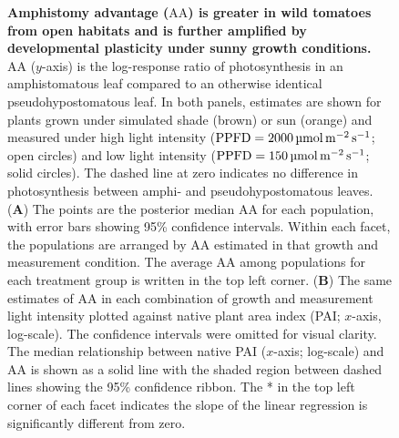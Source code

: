 \documentclass[
  letterpaper,
  DIV=11,
  numbers=noendperiod]{scrartcl}
\newcommand{\aax}{$\mathrm{AA}$}
\newcommand{\ppfdequals}[1]{$\mathrm{PPFD} = \qty{#1}{\micro\mol\raiseto{-2}\meter\raiseto{-1}\second}$}
\begin{document}
\begin{linenumbers}
\begin{doublespace}
\begin{figure}
\caption{\label{fig-aacap}\textbf{Amphistomy advantage (\aax{}) is greater in wild tomatoes from open habitats and is further amplified by developmental plasticity under sunny growth conditions.}
\aax{} (\(y\)-axis) is the log-response ratio of photosynthesis in an
amphistomatous leaf compared to an otherwise identical
pseudohypostomatous leaf. In both panels, estimates are shown for plants
grown under simulated shade (brown) or sun (orange) and measured under
high light intensity (\ppfdequals{2000}; open circles) and low light
intensity (\ppfdequals{150}; solid circles). The dashed line at zero
indicates no difference in photosynthesis between amphi- and
pseudohypostomatous leaves. (\textbf{A}) The points are the posterior
median \aax{} for each population, with error bars showing 95\%
confidence intervals. Within each facet, the populations are arranged by
\aax{} estimated in that growth and measurement condition. The average
\aax{} among populations for each treatment group is written in the top
left corner. (\textbf{B}) The same estimates of \aax{} in each
combination of growth and measurement light intensity plotted against
native plant area index (PAI; \(x\)-axis, log-scale). The confidence
intervals were omitted for visual clarity. The median relationship
between native PAI (\(x\)-axis; log-scale) and \aax{} is shown as a
solid line with the shaded region between dashed lines showing the 95\%
confidence ribbon. The * in the top left corner of each facet indicates
the slope of the linear regression is significantly different from
zero.}

\end{figure}%


\end{doublespace}
\end{linenumbers}
\end{document}

